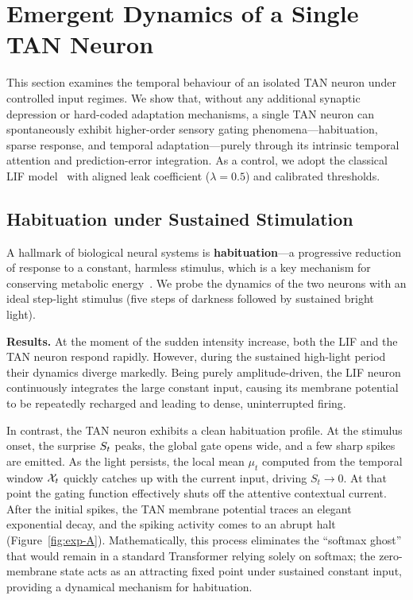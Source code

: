 \section{Emergent Dynamics of a Single TAN Neuron}\label{sec:emergent-single}

This section examines the temporal behaviour of an isolated TAN neuron under controlled input regimes. We show that, without any additional synaptic depression or hard-coded adaptation mechanisms, a single TAN neuron can spontaneously exhibit higher-order sensory gating phenomena---habituation, sparse response, and temporal adaptation---purely through its intrinsic temporal attention and prediction-error integration. As a control, we adopt the classical LIF model~\cite{gerstner2014,abbott1999} with aligned leak coefficient ($\lambda = 0.5$) and calibrated thresholds.

\subsection{Habituation under Sustained Stimulation}

A hallmark of biological neural systems is \textbf{habituation}---a progressive reduction of response to a constant, harmless stimulus, which is a key mechanism for conserving metabolic energy~\cite{benda2003}. We probe the dynamics of the two neurons with an ideal step-light stimulus (five steps of darkness followed by sustained bright light).

\textbf{Results.} At the moment of the sudden intensity increase, both the LIF and the TAN neuron respond rapidly. However, during the sustained high-light period their dynamics diverge markedly. Being purely amplitude-driven, the LIF neuron continuously integrates the large constant input, causing its membrane potential to be repeatedly recharged and leading to dense, uninterrupted firing.

In contrast, the TAN neuron exhibits a clean habituation profile. At the stimulus onset, the surprise ${S_t}$ peaks, the global gate opens wide, and a few sharp spikes are emitted. As the light persists, the local mean $\mu_t$ computed from the temporal window ${\mathcal{X}_t}$ quickly catches up with the current input, driving $S_t \to 0$. At that point the gating function effectively shuts off the attentive contextual current. After the initial spikes, the TAN membrane potential traces an elegant exponential decay, and the spiking activity comes to an abrupt halt (Figure~\ref{fig:exp-A}). Mathematically, this process eliminates the ``softmax ghost'' that would remain in a standard Transformer relying solely on softmax; the zero-membrane state acts as an attracting fixed point under sustained constant input, providing a dynamical mechanism for habituation.

